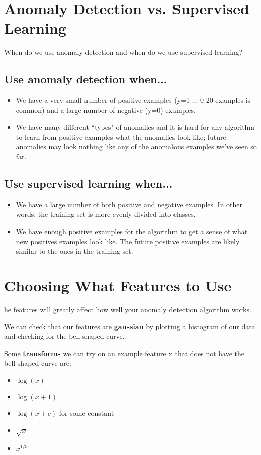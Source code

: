 \section{Anomaly Detection vs. Supervised Learning}
When do we use anomaly detection and when do we use supervised learning?

\subsection{Use anomaly detection when...}
\begin{itemize}
\item We have a very small number of positive examples (y=1 ... 0-20 examples is common) and a large number of negative (y=0) examples.
\item We have many different ``types" of anomalies and it is hard for any algorithm to learn from positive examples what the anomalies look like; future anomalies may look nothing like any of the anomalous examples we've seen so far.
\end{itemize}

\subsection{Use supervised learning when...}
\begin{itemize}
\item We have a large number of both positive and negative examples. In other words, the training set is more evenly divided into classes.
\item We have enough positive examples for the algorithm to get a sense of what new positives examples look like. The future positive examples are likely similar to the ones in the training set.
\end{itemize}

\section{Choosing What Features to Use}
he features will greatly affect how well your anomaly detection algorithm works.

We can check that our features are \textbf{gaussian} by plotting a histogram of our data and checking for the bell-shaped curve.

Some \textbf{transforms} we can try on an example feature x that does not have the bell-shaped curve are:

\begin{itemize}
\item $\log(x)$
\item $\log(x+1)$
\item $\log(x+c)$ for some constant
\item $\sqrt{x}$
\item $x^{1/3}$
\end{itemize}

